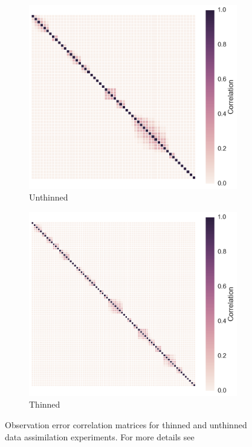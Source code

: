 \documentclass[12pt]{article}
\begin{document}
\begin{figure}[ht]
    \centering
    \begin{subfigure}[b]{0.49\textwidth}
        \includegraphics[width=\textwidth]{_rmat_east.png}
        \caption{Unthinned}
        \label{fig:rmat_east}
        \end{subfigure}
     \begin{subfigure}[b]{0.49\textwidth}
        \includegraphics[width=\textwidth]{_rmat_west.png}
        \caption{Thinned}
        \label{fig:rmat_west}
    \end{subfigure}
    \caption{Observation error correlation matrices for thinned and unthinned data assimilation experiments. For more details see \citet{Pinnington2016299}} \label{fig:rmat}
\end{figure}
\end{document}

